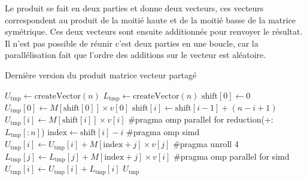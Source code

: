 \documentclass[11pt,french]{article}
\begin{document}
		\par Le produit se fait en deux parties et donne deux vecteurs, ces vecteurs correspondent au produit de la moitié haute et de la moitié basse de la matrice symétrique. Ces deux vecteurs sont ensuite additionnés pour renvoyer le résultat. Il n'est pas possible de réunir c'est deux parties en une boucle, car la parallélisation fait que l’ordre des additions sur le vecteur est aléatoire.
		
	\begin{algorithm}[H]
		\caption{Dernière version du produit matrice vecteur partagé}\label{alg:pmv}
		\begin{algorithmic}[0]
		\State $U_{\text{tmp}} \gets \text{createVector}(n)$
		\State $L_{\text{tmp}} \gets \text{createVector}(n)$
		\State $\text{shift}[0] \gets 0$ 
		\State $U_{\text{tmp}}[0] \gets M[\text{shift}[0]] \times v[0]$  
		\State $\text{shift}[i] \gets \text{shift}[i-1] + (n - i + 1)$
		\State $U_{\text{tmp}}[i] \gets M[\text{shift}[i]] \times v[i]$
		\EndFor
		\State \#pragma omp parallel for reduction(+:$L_{\text{tmp}}[:n]$)
		\State $\text{index} \gets \text{shift}[i] - i$
		\State \#pragma omp simd
		 
		\State $U_{\text{tmp}}[i] \gets U_{\text{tmp}}[i] + M[\text{index} + j] \times v[j]$
		\EndFor
		\State \#pragma unroll 4
		 
		\State $L_{\text{tmp}}[j] \gets L_{\text{tmp}}[j] + M[\text{index} + j] \times v[i]$
		\EndFor
		\EndFor
		\State \#pragma omp parallel for simd
		  
		\State $U_{\text{tmp}}[i] \gets U_{\text{tmp}} [i] + L_{\text{tmp}}[i]$
		\EndFor
		\State \Return $U_{\text{tmp}} $
		\EndFunction
		\end{algorithmic}
	\end{algorithm}
	
	\vspace*{0.5cm}
	
\end{document}
